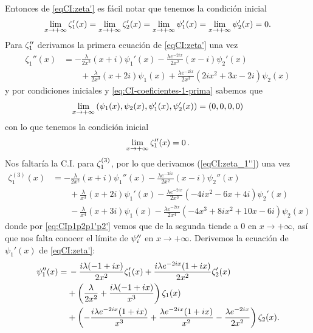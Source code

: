 \documentclass[%
 aip,
 jmp,%
 amsmath,amssymb,
 reprint,%
]{revtex4-2}
\begin{document}
Entonces de \eqref{eqCI:zeta'} es fácil notar que tenemos la condición inicial
\begin{equation}\label{eq:CI-coeficientes-1-prima}
    \lim_{x\to +\infty} \zeta_1'(x) = \lim_{x\to +\infty} \zeta_2'(x)=  \lim_{x\to +\infty} \psi_1'(x)=  \lim_{x\to +\infty} \psi_2'(x)= 0.
\end{equation}
Para $\zeta_1''$ derivamos la primera ecuación de \eqref{eqCI:zeta'} una vez
\begin{equation}\label{eqCI:zeta_1''}
\begin{aligned}
    \zeta_1''(x) &= -\frac{\lambda}{2 x^2} (x+i) \psi_1'(x) - \frac{\lambda  e^{-2 i x}}{2 x^2} (x-i) \psi_2'(x)\\
    &\qquad + \frac{\lambda}{2 x^3} (x+2 i) \psi_1(x) + \frac{\lambda  e^{-2 i x}}{2 x^3} \left(2 i x^2+3 x-2 i\right) \psi_2(x)
\end{aligned}
\end{equation}
y por condiciones iniciales y \eqref{eq:CI-coeficientes-1-prima} sabemos que
\begin{equation}\label{eq:CIp1p2p1'p2'}
    \lim_{x \to +\infty} \qty(\psi_1(x), \psi_2(x), \psi_1'(x), \psi_2'(x)) = \qty(0,0,0,0)
\end{equation}
con lo que tenemos la condición inicial
\begin{equation}
   \lim_{x \to +\infty} \zeta_1''(x)=0\,.
\end{equation}
Nos faltaría la C.I. para $\zeta_1^{(3)}$, por lo que derivamos (\ref{eqCI:zeta_1''}) una vez
\begin{equation}
\begin{aligned}
    \zeta_1^{(3)}(x) &= -\frac{\lambda}{2 x^2} (x+i) \psi_1''(x) - \frac{\lambda  e^{-2 i x}}{2 x^2} (x-i) \psi_2''(x)\\
    &\qquad +\frac{\lambda}{x^3} (x+2 i) \psi_1'(x) - \frac{\lambda  e^{-2 i x}}{2 x^3} \left(-4 i x^2-6 x+4 i\right) \psi_2'(x)\\
    &\qquad -\frac{\lambda}{x^4} (x+3 i) \psi_1(x)- \frac{\lambda  e^{-2 i x}}{2 x^4} \left(-4 x^3+8 i x^2+10 x-6 i\right) \psi_2(x)
\end{aligned}
\end{equation}
donde por \eqref{eq:CIp1p2p1'p2'} vemos que de la segunda tiende a $0$ en $x \to +\infty$, así que nos falta conocer el límite de $\psi_i''$ en $x\to+\infty$. Derivemos la ecuación de $\psi_1'(x)$ de \eqref{eqCI:zeta'}:
\begin{equation}
    \begin{aligned}
        \psi_1''(x)=&\,-\frac{i \lambda  (-1+i x) }{2 x^2}\zeta_1'(x)+\frac{i \lambda  e^{-2 i x} (1+i x) }{2 x^2}\zeta_2'(x)\\
        &+\left(\frac{\lambda }{2 x^2}+\frac{i \lambda  (-1+i x)}{x^3}\right)\zeta_1(x) \\
        & + \left(-\frac{i \lambda  e^{-2 i x} (1+i x)}{x^3}+\frac{\lambda  e^{-2 i x} (1+i x)}{x^2}-\frac{\lambda  e^{-2 i x}}{2 x^2}\right)\zeta_2(x).
    \end{aligned}
\end{equation}
\end{document}
